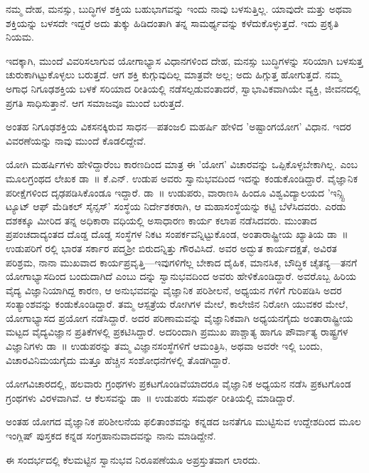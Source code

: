 ನಮ್ಮ ದೇಹ, ಮನಸ್ಸು, ಬುದ್ಧಿಗಳ ಶಕ್ತಿಯ ಬಹುಭಾಗವನ್ನು ಇಂದು ನಾವು ಬಳಸುತ್ತಿಲ್ಲ. ಯಾವುದೇ ಮತ್ತು ಅಥವಾ ಶಕ್ತಿಯನ್ನು ಬಳಸದೇ ಇದ್ದರೆ ಅದು ತುಕ್ಕು ಹಿಡಿದಂತಾಗಿ ತನ್ನ ಸಾಮರ್ಥ್ಯವನ್ನು ಕಳೆದುಕೊಳ್ಳುತ್ತದೆ. ಇದು ಪ್ರಕೃತಿ ನಿಯಮ.

ಇದಕ್ಕಾಗಿ, ಮುಂದೆ ವಿವರಿಸಲಾಗುವ ಯೋಗಾಭ್ಯಾಸ ವಿಧಾನಗಳಿಂದ ದೇಹ, ಮನಸ್ಸು ಬುದ್ಧಿಗಳನ್ನು ಸರಿಯಾಗಿ ಬಳಸುತ್ತ ಚುರುಕಾಗಿಟ್ಟುಕೊಳ್ಳಲು ಬರುತ್ತದೆ. ಆಗ ಶಕ್ತಿ ಕುಗ್ಗುವುದಿಲ್ಲ ಮಾತ್ರವೇ ಅಲ್ಲ; ಅದು ಹಿಗ್ಗುತ್ತ ಹೋಗುತ್ತದೆ. ನಮ್ಮ ಅಗಾಧ ನಿಗೂಢಶಕ್ತಿಯ ಬಳಕೆ ಸರಿಯಾದ ರೀತಿಯಲ್ಲಿ ನಡೆಸಲ್ಪಡುವಂತಾದರೆ, ಸ್ವಾಭಾವಿಕವಾಗಿಯೇ ವ್ಯಕ್ತಿ, ಜೀವನದಲ್ಲಿ ಪ್ರಗತಿ ಸಾಧಿಸುತ್ತಾನೆ. ಆಗ ಸಮಾಜವೂ ಮುಂದೆ ಬರುತ್ತದೆ.

ಅಂತಹ ನಿಗೂಢಶಕ್ತಿಯ ವಿಕಸನಕ್ಕಿರುವ ಸಾಧನ—ಪತಂಜಲಿ ಮಹರ್ಷಿ ಹೇಳಿದ 'ಅಷ್ಟಾಂಗಯೋಗ' ವಿಧಾನ. ಇದರ ವಿವರಣೆಯನ್ನು ನಾವು ಮುಂದೆ ಕೊಡಲಿದ್ದೇವೆ.

ಯೋಗಿ ಮಹರ್ಷಿಗಳು ಹೇಳಿದ್ದಾರೆಂಬ ಕಾರಣದಿಂದ ಮಾತ್ರ ಈ 'ಯೋಗ' ವಿಚಾರವನ್ನು ಒಪ್ಪಿಕೊಳ್ಳಬೇಕಾಗಿಲ್ಲ.  ಎಂಬ ಮೂಲಗ್ರಂಥದ ಲೇಖಕ ಡಾ~॥ ಕೆ.ಎನ್. ಉಡುಪ ಅವರು ಸ್ವಾನುಭವದಿಂದ ಇದನ್ನು ಕಂಡುಕೊಂಡಿದ್ದಾರೆ. ವೈಜ್ಞಾನಿಕ ಪರೀಕ್ಷೆಗಳಿಂದ ದೃಢಪಡಿಸಿಕೊಂಡೂ ಇದ್ದಾರೆ. ಡಾ~॥ ಉಡುಪರು, ವಾರಾಣಸಿ ಹಿಂದೂ ವಿಶ್ವವಿದ್ಯಾಲಯದ 'ಇನ್ಸ್ಟಿ ಟ್ಯೂಟ್ ಆಫ್ ಮೆಡಿಕಲ್ ಸೈನ್ಸಸ್​' ಸಂಸ್ಥೆಯ ನಿರ್ದೇಶಕರಾಗಿ, ಆ ಮಹಾಸಂಸ್ಥೆಯನ್ನು ಕಟ್ಟಿ ಬೆಳೆಸಿದವರು. ಎರಡು ದಶಕಕ್ಕೂ ಮೀರಿದ ತನ್ನ ಅಧಿಕಾರಾ ವಧಿಯಲ್ಲಿ ಅಸಾಧಾರಣ ಕಾರ್ಯ ಕಲಾಪ ನಡೆಸಿದವರು.  ಮುಂತಾದ ಪ್ರಪಂಚದಾದ್ಯಂತದ ದೊಡ್ಡ ದೊಡ್ಡ ಸಂಸ್ಥೆಗಳ ನಿಕಟ ಸಂಪರ್ಕವನ್ನಿಟ್ಟುಕೊಂಡ, ಅಂತಾರಾಷ್ಟ್ರೀಯ ಖ್ಯಾತಿಯ ಡಾ~॥ ಉಡುಪರಿಗೆ  ರಲ್ಲಿ ಭಾರತ ಸರ್ಕಾರ ಪದ್ಮಶ‍್ರೀ ಬಿರುದನ್ನಿತ್ತು ಗೌರವಿಸಿದೆ. ಅವರ ಅದ್ಭುತ ಕಾರ್ಯದಕ್ಷತೆ, ಅವಿರತ ಪರಿಶ್ರಮ, ನಾನಾ ಮುಖವಾದ ಕಾರ್ಯಪ್ರವೃತ್ತಿ—ಇವುಗಳಿಗೆಲ್ಲ ಬೇಕಾದ ದೈಹಿಕ, ಮಾನಸಿಕ, ಬೌದ್ಧಿಕ ಚೈತನ್ಯ—ತನಗೆ ಯೋಗಾಭ್ಯಾಸದಿಂದ ಬಂದುದಾಗಿದೆ ಎಂಬು ದನ್ನು ಸ್ವಾನುಭವದಿಂದ ಅವರು ಹೇಳಿಕೊಂಡಿದ್ದಾರೆ. ಅವರೊಬ್ಬ ಹಿರಿಯ ವೈದ್ಯ ವಿಜ್ಞಾನಿಯಾಗಿದ್ದ ಕಾರಣ, ಆ ಅನುಭವವನ್ನು ವೈಜ್ಞಾನಿಕ ಪರಿಶೀಲನೆ, ಅಧ್ಯಯನ ಗಳಿಗೆ ಗುರಿಪಡಿಸಿ ಅದರ ಸಂತ್ಯಾಂಶವನ್ನು ಕಂಡುಕೊಂಡಿದ್ದಾರೆ. ತಮ್ಮ ಆಸ್ಪತ್ರೆಯ ರೋಗಿಗಳ ಮೇಲೆ, ಕಾಲೇಜಿನ ನಿರೋಗಿ ಯುವಕರ ಮೇಲೆ, ಯೋಗಾಭ್ಯಾಸದ ಪ್ರಯೋಗ ನಡೆಸಿದ್ದಾರೆ. ಅದರ ಪರಿಣಾಮವನ್ನು ವೈಜ್ಞಾನಿಕವಾಗಿ ಅಧ್ಯಯನಗೈದು ಅಂತಾರಾಷ್ಟ್ರೀಯ ಮಟ್ಟದ ವೈದ್ಯವಿಜ್ಞಾನ ಪ್ರತಿಕೆಗಳಲ್ಲಿ ಪ್ರಕಟಿಸಿದ್ದಾರೆ. ಅದರಿಂದಾಗಿ ಪ್ರಮುಖ ಪಾಶ್ಚಾತ್ಯ ಹಾಗೂ ಪೌರ್ವಾತ್ಯ ರಾಷ್ಟ್ರಗಳ ವಿಜ್ಞಾನಿಗಳು ಡಾ~॥ ಉಡುಪರನ್ನು ತಮ್ಮ ವಿಜ್ಞಾನಸಂಸ್ಥೆಗಳಿಗೆ ಆಮಂತ್ರಿಸಿ, ಅಥವಾ ಅವರೇ ಇಲ್ಲಿ ಬಂದು, ವಿಚಾರವಿನಿಮಯಗೈದು ಮತ್ತೂ ಹೆಚ್ಚಿನ ಸಂಶೋಧನೆಗಳಲ್ಲಿ ತೊಡಗಿದ್ದಾರೆ.

ಯೋಗವಿಚಾರದಲ್ಲಿ, ಹಲವಾರು ಗ್ರಂಥಗಳು ಪ್ರಕಟಗೊಂಡಿವೆಯಾದರೂ ವೈಜ್ಞಾನಿಕ ಅಧ್ಯಯನ ನಡೆಸಿ ಪ್ರಕಟಗೊಂಡ ಗ್ರಂಥಗಳು ವಿರಳವಾಗಿವೆ. ಆ ಕೆಲಸವನ್ನು ಡಾ~॥ ಉಡುಪರು ಸಮರ್ಥ ರೀತಿಯಲ್ಲಿ ಮಾಡಿದ್ದಾರೆ.

ಅಂತಹ ಯೋಗದ ವೈಜ್ಞಾನಿಕ ಪರಿಶೀಲನೆಯ ಫಲಿತಾಂಶವನ್ನು ಕನ್ನಡದ ಜನತೆಗೂ ಮುಟ್ಟಿಸುವ ಉದ್ದೇಶದಿಂದ ಮೂಲ ಇಂಗ್ಲಿಷ್ ಪುಸ್ತಕದ ಕನ್ನಡ ಸಂಗ್ರಹಾನುವಾದವನ್ನು ನಾನು ಮಾಡಿದ್ದೇನೆ.

ಈ ಸಂದರ್ಭದಲ್ಲಿ ಕೆಲಮಟ್ಟಿನ ಸ್ವಾನುಭವ ನಿರೂಪಣೆಯೂ ಅಪ್ರಸ್ತುತವಾಗ ಲಾರದು.

